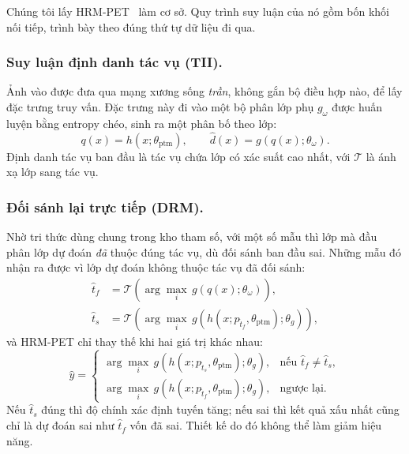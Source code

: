 \documentclass[runningheads]{llncs}
\begin{document}
Chúng tôi lấy HRM-PET~\cite{ref_hrmpet} làm cơ sở. Quy trình suy luận của nó gồm
bốn khối nối tiếp, trình bày theo đúng thứ tự dữ liệu đi qua.

\subsubsection{Suy luận định danh tác vụ (TII).}
Ảnh vào được đưa qua mạng xương sống \emph{trần}, không gắn bộ điều hợp nào, để
lấy đặc trưng truy vấn. Đặc trưng này đi vào một bộ phân lớp phụ $g_\omega$ được
huấn luyện bằng entropy chéo, sinh ra một phân bố theo lớp:
\begin{equation}
q(x) = h(x;\theta_{\mathrm{ptm}}),
\qquad
\hat{d}(x) = g\!\left(q(x); \theta_\omega\right).
\label{eq:tii}
\end{equation}
Định danh tác vụ ban đầu là tác vụ chứa lớp có xác suất cao nhất, với
$\mathcal{T}$ là ánh xạ lớp sang tác vụ.

\subsubsection{Đối sánh lại trực tiếp (DRM).}
Nhờ tri thức dùng chung trong kho tham số, với một số mẫu thì lớp mà đầu phân lớp
dự đoán \emph{đã} thuộc đúng tác vụ, dù đối sánh ban đầu sai. Những mẫu đó nhận ra
được vì lớp dự đoán không thuộc tác vụ đã đối sánh:
\begin{align}
\hat{t}_f &= \mathcal{T}\!\left(\arg\max_i\, g(q(x);\theta_\omega)\right),
\label{eq:tf}\\
\hat{t}_s &= \mathcal{T}\!\left(\arg\max_i\,
   g\!\left(h(x; p_{\hat{t}_f}, \theta_{\mathrm{ptm}}); \theta_g\right)\right),
\label{eq:ts}
\end{align}
và HRM-PET chỉ thay thế khi hai giá trị khác nhau:
\begin{equation}
\hat{y} =
\begin{cases}
\arg\max_i\, g\!\left(h(x; p_{\hat{t}_s}, \theta_{\mathrm{ptm}}); \theta_g\right),
  & \text{nếu } \hat{t}_f \neq \hat{t}_s,\\[2pt]
\arg\max_i\, g\!\left(h(x; p_{\hat{t}_f}, \theta_{\mathrm{ptm}}); \theta_g\right),
  & \text{ngược lại.}
\end{cases}
\label{eq:drm}
\end{equation}
Nếu $\hat{t}_s$ đúng thì độ chính xác định tuyến tăng; nếu sai thì kết quả xấu
nhất cũng chỉ là dự đoán sai như $\hat{t}_f$ vốn đã sai. Thiết kế do đó không thể
làm giảm hiệu năng.
\end{document}
